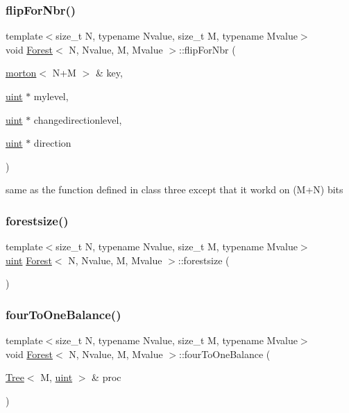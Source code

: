 \subsubsection{\texorpdfstring{flip\+For\+Nbr()}{flipForNbr()}}
{\footnotesize\ttfamily template$<$size\+\_\+t N, typename Nvalue, size\+\_\+t M, typename Mvalue$>$ \\
void \mbox{\hyperlink{classForest}{Forest}}$<$ N, Nvalue, M, Mvalue $>$\+::flip\+For\+Nbr (\begin{DoxyParamCaption}\item[{\mbox{\hyperlink{definitions_8h_af8682350bd8bb38ee9023f7a0a310add}{morton}}$<$ N+M $>$ \&}]{key,  }\item[{\mbox{\hyperlink{definitions_8h_a69aa29b598b851b0640aa225a9e5d61d}{uint}} $\ast$}]{mylevel,  }\item[{\mbox{\hyperlink{definitions_8h_a69aa29b598b851b0640aa225a9e5d61d}{uint}} $\ast$}]{changedirectionlevel,  }\item[{\mbox{\hyperlink{definitions_8h_a69aa29b598b851b0640aa225a9e5d61d}{uint}} $\ast$}]{direction }\end{DoxyParamCaption})}

same as the function defined in class three except that it workd on (M+N) bits \mbox{\label{classForest_a0de3c18eb1d25d45fff90e1ea2c96eaf}} 
\subsubsection{\texorpdfstring{forestsize()}{forestsize()}}
{\footnotesize\ttfamily template$<$size\+\_\+t N, typename Nvalue, size\+\_\+t M, typename Mvalue$>$ \\
\mbox{\hyperlink{definitions_8h_a69aa29b598b851b0640aa225a9e5d61d}{uint}} \mbox{\hyperlink{classForest}{Forest}}$<$ N, Nvalue, M, Mvalue $>$\+::forestsize (\begin{DoxyParamCaption}{ }\end{DoxyParamCaption})}

\mbox{\label{classForest_aec1673fba6a68aa0a1da57526370f2f2}} 
\subsubsection{\texorpdfstring{four\+To\+One\+Balance()}{fourToOneBalance()}}
{\footnotesize\ttfamily template$<$size\+\_\+t N, typename Nvalue, size\+\_\+t M, typename Mvalue$>$ \\
void \mbox{\hyperlink{classForest}{Forest}}$<$ N, Nvalue, M, Mvalue $>$\+::four\+To\+One\+Balance (\begin{DoxyParamCaption}\item[{\mbox{\hyperlink{classTree}{Tree}}$<$ M, \mbox{\hyperlink{definitions_8h_a69aa29b598b851b0640aa225a9e5d61d}{uint}} $>$ \&}]{proc }\end{DoxyParamCaption})}

